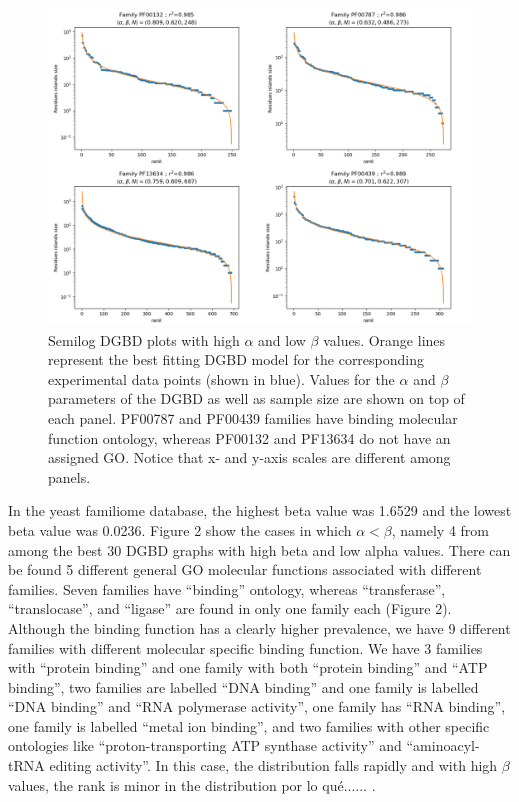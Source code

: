 \documentclass[preprint,12pt]{elsarticle}
\begin{document}
\begin{figure} %
    \centering
    \includegraphics[width=13cm]{images/01_mejoresAlfa.png}
    \caption{Semilog DGBD plots with high $\alpha$ and low $\beta$ values.  
    Orange lines represent  the best fitting DGBD model for the 
    corresponding experimental data points (shown in blue). Values 
    for the $\alpha$ and $\beta$ parameters of the DGBD as well as 
    sample size are shown on top of each panel. PF00787 and 
    PF00439 families have binding molecular function ontology, whereas 
    PF00132 and PF13634 do not have an assigned GO. Notice that  x- 
    and y-axis scales are different among panels.}
    \label{fig:alpha}
\end{figure}
\clearpage


In the yeast familiome database, the highest beta value was 1.6529 
and the lowest beta value was 0.0236. Figure 2 show the cases in 
which $\alpha < \beta $, namely  4 from among the best 30 DGBD 
graphs with high beta and low alpha values. There can be found 5 
different general GO molecular functions associated  with different 
families. Seven families have ``binding'' ontology, whereas ``transferase'', 
``translocase'', and ``ligase'' are found in only one family each 
(Figure 2). Although the binding function  has a clearly higher 
prevalence, we have 9 different families with different molecular 
specific binding function. We have 3 families with ``protein binding'' 
and one family with both ``protein binding'' and ``ATP binding'', 
two families are labelled ``DNA binding'' and one family is labelled 
``DNA binding'' and ``RNA polymerase activity'', one family has 
``RNA binding'', one family is labelled ``metal ion binding'', and 
two families with other specific ontologies like ``proton-transporting 
ATP synthase activity'' and ``aminoacyl-tRNA editing activity''. 
In this case, the distribution falls rapidly and with high $\beta$ values, 
the rank is minor in the distribution por lo qué...... 
\cite{martinez2009universality}.
\end{document}
